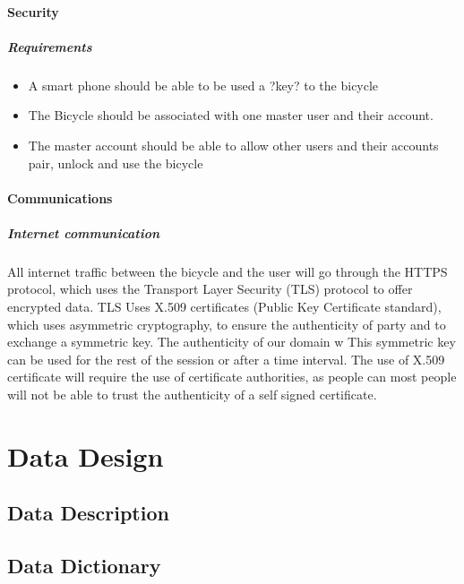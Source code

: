 \documentclass[]{report}
\begin{document}
\subsubsection{\textbf{Security}}

\paragraph{Requirements}

\begin{itemize}
\item A smart phone should be able to be used a ?key? to the bicycle
\item The Bicycle should be associated with one master user and their account.
\item The master account should be able to allow other users and their accounts pair, unlock and use the bicycle

\end{itemize}


\subsubsection{Communications}


\paragraph{Internet communication}

All internet traffic between the bicycle and the user will go through the HTTPS protocol, which uses the Transport Layer Security (TLS) protocol to offer encrypted data. TLS Uses X.509 certificates (Public Key Certificate standard), which uses asymmetric cryptography, to ensure the authenticity of party and to exchange a symmetric key. The authenticity of our domain w This symmetric key can be used for the rest of the session or after a time interval. The use of X.509 certificate will require the use of  certificate authorities, as people can most people will not be able to trust the authenticity of a self signed certificate.


\chapter{Data Design}
\section{Data Description}
\section{Data Dictionary}
\end{document}
